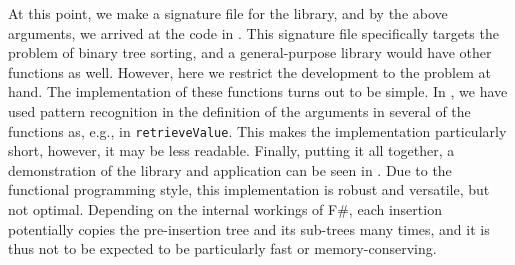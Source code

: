 \documentclass[fsharpNotes.tex]{subfiles}
\begin{document}
At this point, we make a signature file for the library, and by the above arguments, we arrived at the code in .
%
%
This signature file specifically targets the problem of binary tree sorting, and a general-purpose library would have other functions as well. However, here we restrict the development to the problem at hand. The implementation of these functions turns out to be simple. In , we have used pattern recognition in the definition of the arguments in several of the functions as, e.g., in \lstinline{retrieveValue}.
%
%
This makes the implementation particularly short, however, it may be less readable. Finally, putting it all together, a demonstration of the library and application can be seen in .
Due to the functional programming style, this implementation is robust and versatile, but not optimal. Depending on the internal workings of F\#, each insertion potentially copies the pre-insertion tree and its sub-trees many times, and it is thus not to be expected to be particularly fast or memory-conserving. 
\end{document}
